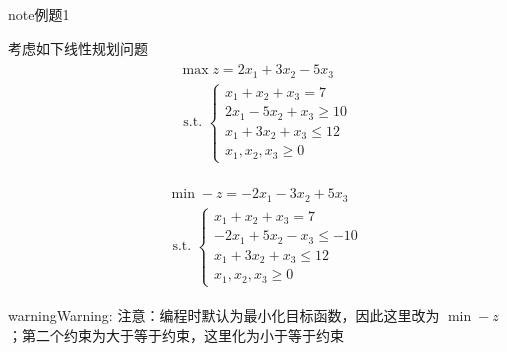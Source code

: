 \documentclass[letterpaper,10pt,english]{sphinxmanual}
\begin{document}
\begin{sphinxadmonition}{note}{例题1}

考虑如下线性规划问题
\begin{equation*}
\begin{split}
\begin{aligned}
&\max z=2 x_{1}+3 x_{2}-5 x_{3}\\
&\text { s.t. }\left\{\begin{array}{l}
{x_{1}+x_{2}+x_{3}=7} \\
{2 x_{1}-5 x_{2}+x_{3} \geq 10} \\
{x_{1}+3 x_{2}+x_{3} \leq 12}\\
{x_{1}, x_{2}, x_{3} \geq 0}
\end{array}\right.
\end{aligned}
\end{split}
\end{equation*}\end{sphinxadmonition}


\begin{sphinxVerbatim}[commandchars=\\\{\}]
    
      
\end{sphinxVerbatim}


\begin{sphinxVerbatim}[commandchars=\\\{\}]
\end{sphinxVerbatim}

\begin{equation*}
\begin{split}
\begin{aligned}
&{\min -z=-2 x_{1}-3 x_{2}+5 x_{3}}\\
&\text { s.t. }\left\{\begin{array}{l}
{x_{1}+x_{2}+x_{3}=7} \\
{-2 x_{1}+5 x_{2}-x_{3} \leq -10} \\
{x_{1}+3 x_{2}+x_{3} \leq 12}\\
{x_{1}, x_{2}, x_{3} \geq 0}
\end{array}\right.
\end{aligned}
\end{split}
\end{equation*}
\begin{sphinxadmonition}{warning}{Warning:}
注意：编程时默认为最小化目标函数，因此这里改为 \(\min-z\)；第二个约束为大于等于约束，这里化为小于等于约束
\end{sphinxadmonition}
\end{document}
